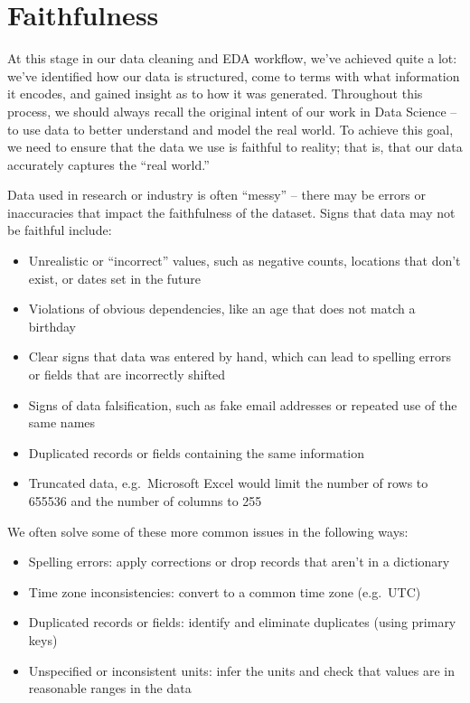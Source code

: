 \documentclass[
  letterpaper,
  DIV=11,
  numbers=noendperiod]{scrreprt}
\providecommand{\tightlist}{%
  \setlength{\itemsep}{0pt}\setlength{\parskip}{0pt}}\usepackage{longtable,booktabs,array}
\begin{document}
\section{Faithfulness}\label{faithfulness}

At this stage in our data cleaning and EDA workflow, we've achieved
quite a lot: we've identified how our data is structured, come to terms
with what information it encodes, and gained insight as to how it was
generated. Throughout this process, we should always recall the original
intent of our work in Data Science -- to use data to better understand
and model the real world. To achieve this goal, we need to ensure that
the data we use is faithful to reality; that is, that our data
accurately captures the ``real world.''

Data used in research or industry is often ``messy'' -- there may be
errors or inaccuracies that impact the faithfulness of the dataset.
Signs that data may not be faithful include:

\begin{itemize}
\tightlist
\item
  Unrealistic or ``incorrect'' values, such as negative counts,
  locations that don't exist, or dates set in the future
\item
  Violations of obvious dependencies, like an age that does not match a
  birthday
\item
  Clear signs that data was entered by hand, which can lead to spelling
  errors or fields that are incorrectly shifted
\item
  Signs of data falsification, such as fake email addresses or repeated
  use of the same names
\item
  Duplicated records or fields containing the same information
\item
  Truncated data, e.g.~Microsoft Excel would limit the number of rows to
  655536 and the number of columns to 255
\end{itemize}

We often solve some of these more common issues in the following ways:

\begin{itemize}
\tightlist
\item
  Spelling errors: apply corrections or drop records that aren't in a
  dictionary
\item
  Time zone inconsistencies: convert to a common time zone (e.g.~UTC)
\item
  Duplicated records or fields: identify and eliminate duplicates (using
  primary keys)
\item
  Unspecified or inconsistent units: infer the units and check that
  values are in reasonable ranges in the data
\end{itemize}
\end{document}
